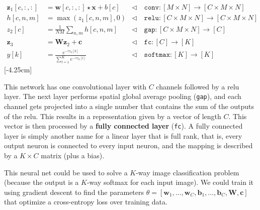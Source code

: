 \begin{align}
    \mathbf{z}_1[c,:,:] &= \mathbf{w}[c,:,:] \star \mathbf{x} + b[c] &\triangleleft \quad \texttt{conv}: [M \times N] \rightarrow [C \times M \times N]\\
    h[c,n,m] &= \max(z_1[c,n,m],0) &\triangleleft \quad \texttt{relu}: [C \times M \times N] \rightarrow [C \times M \times N]\\
    z_2[c] &= \frac{1}{NM} \sum_{n,m} h[c,n,m]  &\triangleleft \quad \texttt{gap}: [C \times M \times N] \rightarrow [C]\\
    \mathbf{z}_{3} &= \mathbf{W} \mathbf{z}_{2} + \mathbf{c} &\triangleleft \quad \texttt{fc}: [C] \rightarrow [K]\\
    y[k] &= \frac{e^{-\tau z_3[k]}}{\sum_{l=1}^K e^{-\tau z_3[l]}} &\triangleleft \quad \texttt{softmax}: [K] \rightarrow [K]
\end{align}
[-4.25cm]

This network has one convolutional layer with $C$ channels followed by a relu layer. The next layer performs spatial global average pooling (\texttt{gap}), and each channel gets projected into a single number that contains the sum of the outputs of the relu. This results in a representation given by a vector of length $C$. This vector is then processed by a \textbf{fully connected layer} (\texttt{fc}). A fully connected layer is simply another name for a linear layer that is full rank, that is, every output neuron is connected to every input neuron, and the mapping is described by a $K \times C$ matrix (plus a bias).

This neural net could be used to solve a $K$-way image classification problem (because the output is a $K$-way softmax for each input image). We could train it using gradient descent to find the parameters $\theta = [\mathbf{w}_1, \ldots, \mathbf{w}_C, \mathbf{b}_1, \ldots, \mathbf{b}_C, \mathbf{W}, \mathbf{c}]$ that optimize a cross-entropy loss over training data.


